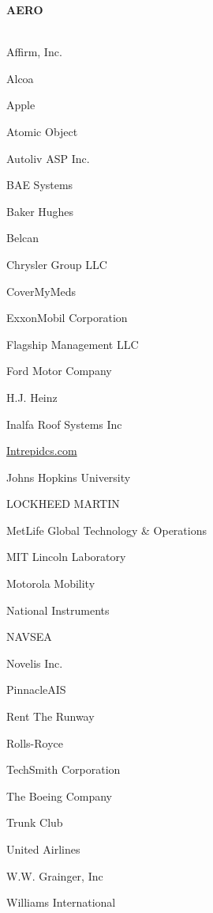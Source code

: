 \documentclass[twoside]{article}
\begin{document}
    \begin{center}\begin{multicols}{5}
    {\fontsize{14}{16}\selectfont \bf AERO}\\
        \vspace{-1em}
        ~\hrulefill~
        \vspace{-.9em}
        \begin{FlushLeft}
        \begin{compactitem}
        \item Affirm, Inc.
\item Alcoa
\item Apple
\item Atomic Object
\item Autoliv ASP Inc.
\item BAE Systems
\item Baker Hughes
\item Belcan
\item Chrysler Group LLC
\item CoverMyMeds
\item ExxonMobil Corporation
\item Flagship Management LLC
\item Ford Motor Company
\item H.J. Heinz
\item Inalfa Roof Systems Inc
\item \url{Intrepidcs.com}
\item Johns Hopkins University
\item LOCKHEED MARTIN
\item MetLife Global Technology \& Operations
\item MIT Lincoln Laboratory
\item Motorola Mobility
\item National Instruments
\item NAVSEA
\item Novelis Inc.
\item PinnacleAIS
\item Rent The Runway
\item Rolls-Royce
\item TechSmith Corporation
\item The Boeing Company
\item Trunk Club
\item United Airlines
\item W.W. Grainger, Inc
\item Williams International
\end{compactitem}

\end{FlushLeft}
\end{multicols}
\end{center}
\end{document}
